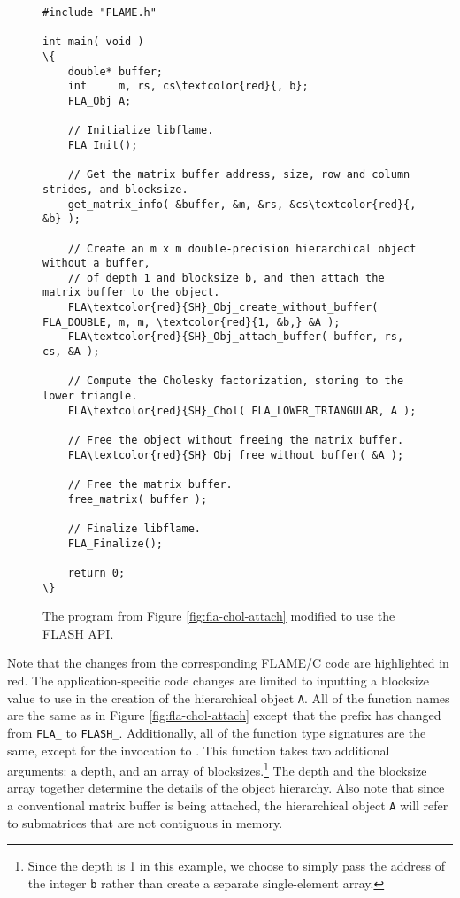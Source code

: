 \begin{figure}[h]
\begin{Verbatim}[frame=single,framesep=2.5mm,xleftmargin=5mm,commandchars=\\\{\},fontsize=\footnotesize]
#include "FLAME.h"

int main( void )
\{
    double* buffer;
    int     m, rs, cs\textcolor{red}{, b};
    FLA_Obj A;

    // Initialize libflame.
    FLA_Init();

    // Get the matrix buffer address, size, row and column strides, and blocksize.
    get_matrix_info( &buffer, &m, &rs, &cs\textcolor{red}{, &b} );

    // Create an m x m double-precision hierarchical object without a buffer,
    // of depth 1 and blocksize b, and then attach the matrix buffer to the object.
    FLA\textcolor{red}{SH}_Obj_create_without_buffer( FLA_DOUBLE, m, m, \textcolor{red}{1, &b,} &A );
    FLA\textcolor{red}{SH}_Obj_attach_buffer( buffer, rs, cs, &A );

    // Compute the Cholesky factorization, storing to the lower triangle.
    FLA\textcolor{red}{SH}_Chol( FLA_LOWER_TRIANGULAR, A );

    // Free the object without freeing the matrix buffer.
    FLA\textcolor{red}{SH}_Obj_free_without_buffer( &A );

    // Free the matrix buffer.
    free_matrix( buffer );

    // Finalize libflame.
    FLA_Finalize();

    return 0;
\}
\end{Verbatim}
\caption{
The program from Figure \ref{fig:fla-chol-attach} modified to use the 
FLASH API.
}
\label{fig:flash-chol-attach}
\end{figure}

\noindent
Note that the changes from the corresponding FLAME/C code are highlighted in
red.
The application-specific code changes are limited to inputting a blocksize
value to use in the creation of the hierarchical object {\tt A}.
All of the \libflame function names are the same as in Figure
\ref{fig:fla-chol-attach} except that the prefix has changed from
{\tt FLA\_} to {\tt FLASH\_}.
Additionally, all of the function type signatures are the same, except
for the invocation to \flashobjcreatewithoutbufferns.
This function takes two additional arguments: a depth, and an array of
blocksizes.\footnote{Since the depth is 1 in this example, we choose to
simply pass the address of the integer {\tt b} rather than create a separate
single-element array.}
The depth and the blocksize array together determine the details of the
object hierarchy.
Also note that since a conventional matrix buffer is being attached, the
hierarchical object {\tt A} will refer to submatrices that are not contiguous
in memory.


